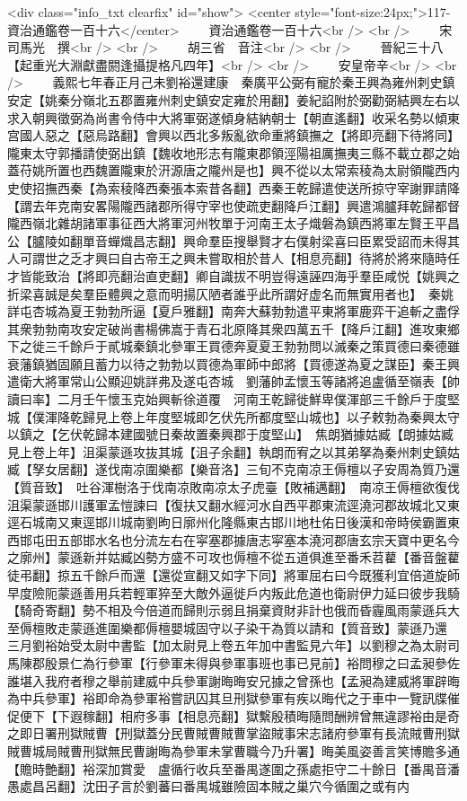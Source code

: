 <div class="info_txt clearfix" id="show">
<center style="font-size:24px;">117-資治通鑑卷一百十六</center>
  　　資治通鑑卷一百十六<br />
<br />
　　宋　司馬光　撰<br />
<br />
　　胡三省　音注<br />
<br />
　　晉紀三十八【起重光大淵獻盡閼逢攝提格凡四年】<br />
<br />
　　安皇帝辛<br />
<br />
　　義熙七年春正月己未劉裕還建康　秦廣平公弼有寵於秦王興為雍州刺史鎮安定【姚秦分嶺北五郡置雍州刺史鎮安定雍於用翻】姜紀諂附於弼勸弼結興左右以求入朝興徵弼為尚書令侍中大將軍弼遂傾身結納朝士【朝直遙翻】收采名勢以傾東宫國人惡之【惡烏路翻】會興以西北多叛亂欲命重將鎮撫之【將即亮翻下待將同】隴東太守郭播請使弼出鎮【魏收地形志有隴東郡領涇陽祖厲撫夷三縣不載立郡之始蓋苻姚所置也西魏置隴東於汧源唐之隴州是也】興不從以太常索稜為太尉領隴西内史使招撫西秦【為索稜降西秦張本索昔各翻】西秦王乾歸遣使送所掠守宰謝罪請降【謂去年克南安畧陽隴西諸郡所得守宰也使疏吏翻降戶江翻】興遣鴻臚拜乾歸都督隴西嶺北雜胡諸軍事征西大將軍河州牧單于河南王太子熾磐為鎮西將軍左賢王平昌公【臚陵如翻單音蟬熾昌志翻】興命羣臣搜舉賢才右僕射梁喜曰臣累受詔而未得其人可謂世之乏才興曰自古帝王之興未嘗取相於昔人【相息亮翻】待將於將來隨時任才皆能致治【將即亮翻治直吏翻】卿自識拔不明豈得遠誣四海乎羣臣咸悦【姚興之折梁喜誠是矣羣臣體興之意而明揚仄陋者誰乎此所謂好虚名而無實用者也】　秦姚詳屯杏城為夏王勃勃所逼【夏戶雅翻】南奔大蘇勃勃遣平東將軍鹿弈干追斬之盡俘其衆勃勃南攻安定破尚書楊佛嵩于青石北原降其衆四萬五千【降戶江翻】進攻東鄉下之徙三千餘戶于貳城秦鎮北參軍王買德奔夏夏王勃勃問以滅秦之策買德曰秦德雖衰藩鎮猶固願且蓄力以待之勃勃以買德為軍師中郎將【買德遂為夏之謀臣】秦王興遣衛大將軍常山公顯迎姚詳弗及遂屯杏城　劉藩帥孟懷玉等諸將追盧循至嶺表【帥讀曰率】二月壬午懷玉克始興斬徐道覆　河南王乾歸徙鮮卑僕渾部三千餘戶于度堅城【僕渾降乾歸見上卷上年度堅城即乞伏先所都度堅山城也】以子敕勃為秦興太守以鎮之【乞伏乾歸本建國號日秦故置秦興郡于度堅山】　焦朗猶據姑臧【朗據姑臧見上卷上年】沮渠蒙遜攻抜其城【沮子余翻】執朗而宥之以其弟拏為秦州刺史鎮姑臧【孥女居翻】遂伐南凉圍樂都【樂音洛】三旬不克南凉王傉檀以子安周為質乃還【質音致】　吐谷渾樹洛于伐南凉敗南凉太子虎臺【敗補邁翻】　南凉王傉檀欲復伐沮渠蒙遜邯川護軍孟愷諫曰【復扶又翻水經河水自西平郡東流逕澆河郡故城北又東逕石城南又東逕邯川城南劉昫日廓州化隆縣東古邯川地杜佑日後漢和帝時侯霸置東西邯屯田五部邯水名也分流左右在寜塞郡據唐志寜塞本澆河郡唐玄宗天寶中更名今之廓州】蒙遜新并姑臧凶勢方盛不可攻也傉檀不從五道俱進至番禾苕藋【番音盤藋徒弔翻】掠五千餘戶而還【還從宣翻又如字下同】將軍屈右曰今既獲利宜倍道旋師早度險阨蒙遜善用兵若輕軍猝至大敵外逼徙戶内叛此危道也衛尉伊力延曰彼步我騎【騎奇寄翻】勢不相及今倍道而歸則示弱且捐棄資財非計也俄而昏霾風雨蒙遜兵大至傉檀敗走蒙遜進圍樂都傉檀嬰城固守以子染干為質以請和【質音致】蒙遜乃還　三月劉裕始受太尉中書監【加太尉見上卷五年加中書監見六年】以劉穆之為太尉司馬陳郡殷景仁為行參軍【行參軍未得與參軍事班也事已見前】裕問穆之曰孟昶參佐誰堪入我府者穆之舉前建威中兵參軍謝晦晦安兄據之曾孫也【孟昶為建威將軍辟晦為中兵參軍】裕即命為參軍裕嘗訊囚其旦刑獄參軍有疾以晦代之于車中一覽訊牒催促便下【下遐稼翻】相府多事【相息亮翻】獄繫殷積晦隨問酬辨曾無違謬裕由是奇之即日署刑獄賊曹【刑獄蓋分民曹賊曹賊曹掌盜賊事宋志諸府參軍有長流賊曹刑獄賊曹城局賊曹刑獄無民曹謝晦為參軍未掌曹職今乃升署】晦美風姿善言笑博贍多通【贍時艶翻】裕深加賞愛　盧循行收兵至番禺遂圍之孫處拒守二十餘日【番禺音潘愚處昌呂翻】沈田子言於劉蕃曰番禺城雖險固本賊之巢穴今循圍之或有内